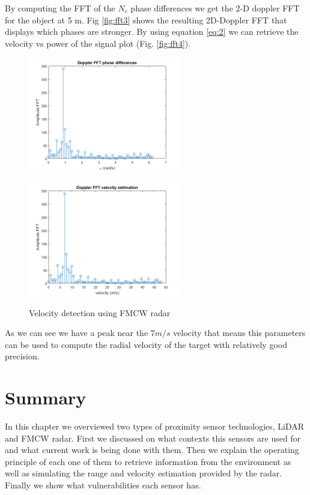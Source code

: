 By computing the FFT of the $N_c$ phase differences we get the 2-D doppler \ac{FFT}  for the object at 5 m.  Fig \ref{fig:fft3} shows the resulting  2D-Doppler FFT that displays which phases are stronger. By using equation \ref{eq:2} we can retrieve the velocity vs power of the signal plot (Fig. \ref{fig:fft4}). 
\begin{figure}[ht] 
    \begin{minipage}[b]{.49\linewidth}
        \includegraphics[height=5cm,width=\linewidth]{imgs/chapter2/fft3.png}
        \label{fig:fft3}
    \end{minipage}
    \begin{minipage}[b]{.49\linewidth}
        \includegraphics[height=5cm,width=\linewidth]{imgs/chapter2/fft4.png}
        \label{fig:fft4}
    \end{minipage}
    \caption{Velocity detection using \ac{FMCW} \ac{radar}}
    \label{fig:velocitydetermination}
\end{figure}
As we can see we have a peak near the $7 m/s$ velocity that means this parameters can be used to compute the radial velocity of the target with relatively good precision. 


\section{Summary}
In this chapter we overviewed two types of proximity sensor technologies, \ac{LiDAR} and \ac{FMCW} radar. First we discussed on what contexts this sensors are used for and what current work is being done with them. Then we explain the operating principle of each one of them to retrieve information from the environment as well as simulating the range and velocity estimation provided by the radar.  Finally we show what vulnerabilities each sensor has.





